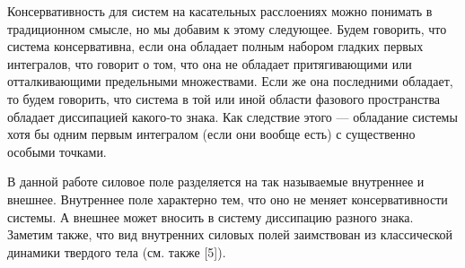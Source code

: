 Консервативность для систем на касательных расслоениях можно понимать в традиционном смысле, но мы добавим к этому следующее.
Будем говорить, что система консервативна, если она обладает полным набором гладких первых интегралов, что говорит о том, что
она не 
обладает притягивающими или отталкивающими предельными множествами. Если же она последними обладает, то будем говорить, что
система в той или иной области фазового пространства обладает диссипацией какого-то знака. Как следствие этого --- обладание системы хотя бы одним первым интегралом 
(если они вообще есть) с существенно особыми точками.

В данной работе силовое поле разделяется на так называемые внутреннее и внешнее. Внутреннее поле характерно тем, что оно не меняет
консервативности системы. А внешнее может вносить в систему диссипацию разного 
знака. Заметим также, что вид внутренних силовых полей заимствован из классической 
динамики твердого тела (см. также [5]).






%

%

